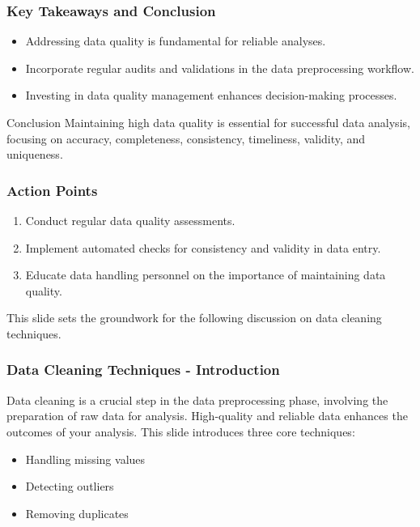 \documentclass{beamer}
\begin{document}
\begin{frame}[fragile]
    \frametitle{Key Takeaways and Conclusion}
    \begin{itemize}
        \item Addressing data quality is fundamental for reliable analyses.
        \item Incorporate regular audits and validations in the data preprocessing workflow.
        \item Investing in data quality management enhances decision-making processes.
    \end{itemize}
    \begin{block}{Conclusion}
        Maintaining high data quality is essential for successful data analysis, focusing on accuracy, completeness, consistency, timeliness, validity, and uniqueness.
    \end{block}
\end{frame}

\begin{frame}[fragile]
    \frametitle{Action Points}
    \begin{enumerate}
        \item Conduct regular data quality assessments.
        \item Implement automated checks for consistency and validity in data entry.
        \item Educate data handling personnel on the importance of maintaining data quality.
    \end{enumerate}
    This slide sets the groundwork for the following discussion on data cleaning techniques.
\end{frame}

\begin{frame}[fragile]
    \frametitle{Data Cleaning Techniques - Introduction}
    Data cleaning is a crucial step in the data preprocessing phase, involving the preparation of raw data for analysis. High-quality and reliable data enhances the outcomes of your analysis. This slide introduces three core techniques: 
    \begin{itemize}
        \item Handling missing values
        \item Detecting outliers
        \item Removing duplicates
    \end{itemize}
\end{frame}
\end{document}

